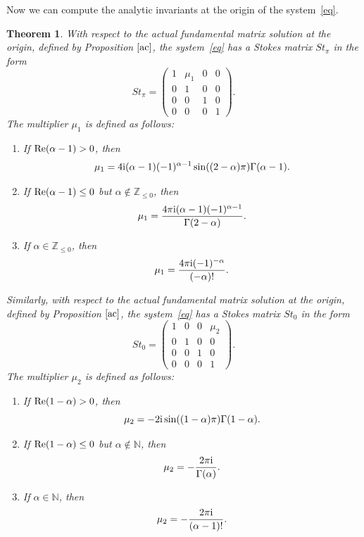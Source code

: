\documentclass[pdftex]{sigma}
\numberwithin{equation}{section}
\newtheorem{Theorem}{Theorem}[section]
\begin{document}
 Now we can compute the analytic invariants at the origin of the system~\eqref{eq}.

 \begin{Theorem}%
 With respect to the actual fundamental matrix solution at the origin, defined by Proposition $\ref{ac}$, the system~\eqref{eq} has a
 Stokes matrix $St_{\pi}$ in the form
 \[
 St_{\pi}=\begin{pmatrix}
 1 & \mu_1 & 0 & 0\\
 0 & 1 & 0 & 0\\
 0 & 0 & 1 & 0\\
 0 & 0 & 0 & 1
 \end{pmatrix} .
 \]
 The multiplier $\mu_1$ is defined as follows:
 \begin{enumerate}
 \itemsep=0pt 	
 \item[$1.$]
 If ${\rm Re} (\alpha-1) > 0$, then
 \[
 \mu_1= 4 {\rm i} (\alpha-1) (-1)^{\alpha-1} \sin((2-\alpha) \pi) \Gamma(\alpha-1) .
 \]
 	
 \item[$2.$]
 If ${\rm Re} (\alpha-1) \leq 0$ but $\alpha\notin\mathbb{Z}_{\leq 0}$, then
 \[
 \mu_1=
 \frac{4 \pi {\rm i} (\alpha-1) (-1)^{\alpha-1}}{\Gamma(2-\alpha)} .
 \]
 	
 \item[$3.$]
 If $\alpha\in\mathbb{Z}_{\leq 0}$, then
 \[
 \mu_1=\frac{4 \pi {\rm i} (-1)^{-\alpha}}{(-\alpha)!} .
 \]
 \end{enumerate}

 Similarly, with respect to the actual fundamental matrix solution at the origin, defined by Proposition $\ref{ac}$, the system~\eqref{eq} has a
 Stokes matrix $St_0$ in the form
 \[
 St_0=\begin{pmatrix}
 1 & 0 & 0 & \mu_2\\
 0 & 1 & 0 & 0\\
 0 & 0 & 1 & 0\\
 0 & 0 & 0 & 1
 \end{pmatrix} .
 \]
 The multiplier $\mu_2$ is defined as follows:
 \begin{enumerate}
 \itemsep=0pt
 	\item[$1.$]
 	If ${\rm Re} (1-\alpha) > 0$, then
 	\[
 	\mu_2=
 	 -2 {\rm i} \sin((1-\alpha) \pi) \Gamma(1-\alpha) .
 	\]
 	
 	\item[$2.$]
 	If ${\rm Re} (1-\alpha) \leq 0$ but $\alpha\notin\mathbb{N}$, then
 	\[
 	\mu_2=-\frac{2 \pi {\rm i}}{\Gamma(\alpha)} .
 	\]
 	
 	\item[$3.$]
 	If $\alpha\in\mathbb{N}$, then
 	\[
 	\mu_2=-\frac{2 \pi {\rm i}}{(\alpha-1)!} .
 	\]
 \end{enumerate}
 \end{Theorem}
\end{document}
